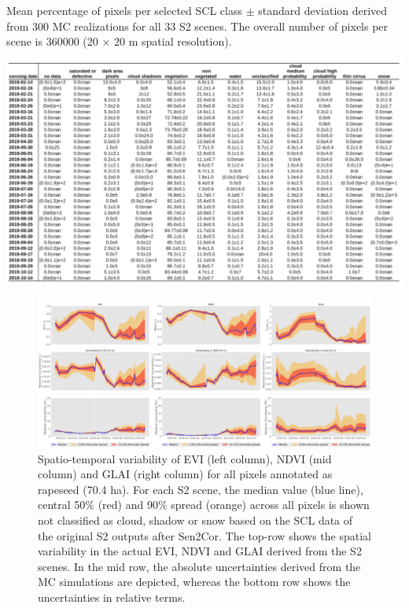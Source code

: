 
\begin{table}[H]
    \caption{Mean percentage of pixels per selected SCL class $\pm$ standard deviation derived from 300 MC realizations for all 33 S2 scenes. The overall number of pixels per scene is 360000 (20 $\times$ 20 m spatial resolution).}
    \includegraphics[width=\textwidth]{04-Uncertainty/img/SCL_Uncertainty_Table.pdf}
    \label{supp:scl_uncertainty}
\end{table}


\begin{figure}[H]
    \centering
    \includegraphics[width=\textwidth]{04-Uncertainty/img/Canola_all-pixels-uncertainty-timeseries.png}
    \caption{Spatio-temporal variability of EVI (left column), NDVI (mid column) and GLAI (right column) for all pixels annotated as rapeseed (70.4 ha). For each S2 scene, the median value (blue line), central 50\% (red) and 90\% spread (orange) across all pixels is shown not classified as cloud, shadow or snow based on the SCL data of the original S2 outputs after Sen2Cor. The top-row shows the spatial variability in the actual EVI, NDVI and GLAI derived from the S2 scenes. In the mid row, the absolute uncertainties derived from the MC simulations are depicted, whereas the bottom row shows the uncertainties in relative terms.}
    \label{fig:rapeseed-timeseries-and-uncertainty}
\end{figure}

